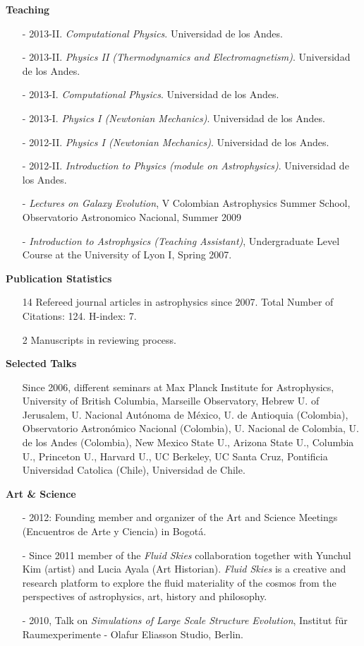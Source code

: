 \documentclass[11pt]{article}
\begin{document}
{\bf Teaching}
\begin{itemize}
\item[-] 2013-II. {\it Computational Physics}. Universidad de los Andes.
\item[-] 2013-II. {\it Physics II (Thermodynamics and Electromagnetism)}. Universidad de los Andes.
\item[-] 2013-I. {\it Computational Physics}. Universidad de los Andes.
\item[-] 2013-I. {\it Physics I (Newtonian Mechanics)}. Universidad de los Andes.
\item[-] 2012-II. {\it Physics I (Newtonian Mechanics)}. Universidad de los Andes.
\item[-] 2012-II. {\it Introduction to Physics (module on Astrophysics)}. Universidad de los Andes.
\item[-]{\it Lectures on Galaxy Evolution}, V Colombian
  Astrophysics Summer School, Observatorio Astronomico Nacional, Summer 2009
\item[-]{\it{Introduction to Astrophysics (Teaching
      Assistant)}}, Undergraduate Level Course at the University of Lyon I,
      Spring 2007.
\end{itemize}



{\bf Publication Statistics}
\begin{itemize}
\item[]14 Refereed journal articles in astrophysics since 2007. Total
  Number of Citations: 124. H-index: 7.
\item[]2 Manuscripts in reviewing process.
\end{itemize}


{\bf Selected Talks}
\begin{itemize}
\item [] Since 2006, different seminars at Max Planck Institute for
  Astrophysics, University of British Columbia, Marseille Observatory,
  Hebrew U. of Jerusalem, U. Nacional Aut\'onoma de M\'exico, U. de
  Antioquia (Colombia), Observatorio Astron\'omico Nacional
  (Colombia), U. Nacional de Colombia, U. de los Andes (Colombia), New
  Mexico State U., Arizona State U., Columbia U., Princeton U.,
  Harvard U., UC Berkeley, UC Santa Cruz, Pontificia Universidad
  Catolica (Chile), Universidad de Chile. 
\end{itemize}


{\bf Art \& Science}
\begin{itemize}
\item [-] 2012: Founding member and organizer of the Art and Science Meetings (Encuentros de Arte y Ciencia) in Bogot\'a.
\item [-] Since 2011 member of the {\it Fluid Skies} collaboration
  together with Yunchul Kim (artist) and Lucia Ayala (Art
  Historian). {\it Fluid Skies} is a creative and research platform to
  explore the fluid materiality of the cosmos from the perspectives of
  astrophysics, art, history and philosophy. 
\item [-] 2010, Talk on {\it Simulations of Large Scale Structure
  Evolution}, Institut f\"ur Raumexperimente - Olafur Eliasson Studio,
  Berlin.  
\end{itemize}
\end{document}
